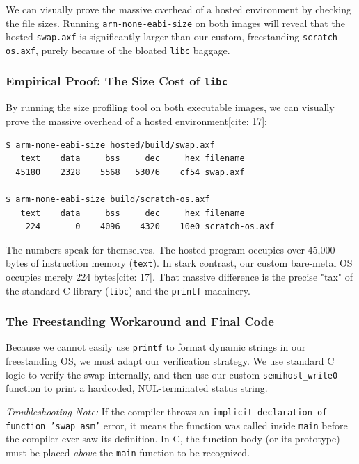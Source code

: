 We can visually prove the massive overhead of a hosted environment by checking the file sizes. Running \texttt{arm-none-eabi-size} on both images will reveal that the hosted \texttt{swap.axf} is significantly larger than our custom, freestanding \texttt{scratch-os.axf}, purely because of the bloated \texttt{libc} baggage.

\subsubsection{Empirical Proof: The Size Cost of \texttt{libc}}
By running the size profiling tool on both executable images, we can visually prove the massive overhead of a hosted environment[cite: 17]:
\begin{lstlisting}
$ arm-none-eabi-size hosted/build/swap.axf
   text    data     bss     dec     hex filename
  45180    2328    5568   53076    cf54 swap.axf

$ arm-none-eabi-size build/scratch-os.axf
   text    data     bss     dec     hex filename
    224       0    4096    4320    10e0 scratch-os.axf
\end{lstlisting}

The numbers speak for themselves. The hosted program occupies over 45,000 bytes of instruction memory (\texttt{text}). In stark contrast, our custom bare-metal OS occupies merely 224 bytes[cite: 17]. That massive difference is the precise "tax" of the standard C library (\texttt{libc}) and the \texttt{printf} machinery.

\subsubsection{The Freestanding Workaround and Final Code}
Because we cannot easily use \texttt{printf} to format dynamic strings in our freestanding OS, we must adapt our verification strategy. We use standard C logic to verify the swap internally, and then use our custom \texttt{semihost\_write0} function to print a hardcoded, NUL-terminated status string.

\textit{Troubleshooting Note:} If the compiler throws an \texttt{implicit declaration of function 'swap\_asm'} error, it means the function was called inside \texttt{main} before the compiler ever saw its definition. In C, the function body (or its prototype) must be placed \textit{above} the \texttt{main} function to be recognized.

